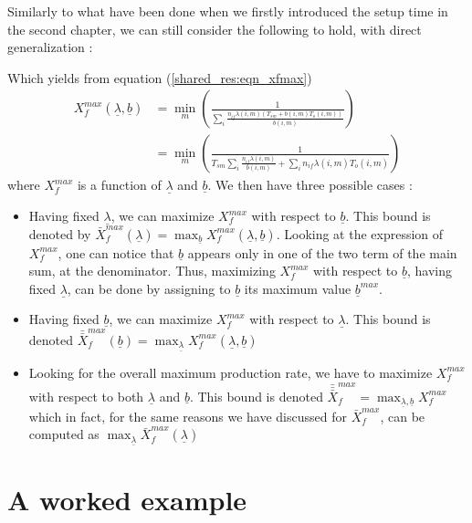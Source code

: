 Similarly to what have been done when we firstly introduced the setup time in the second chapter, we can still consider the following to hold, with direct generalization : 
\begin{center}
\end{center}
Which yields from equation (\ref{shared_res:eqn_xfmax})
\[
    \begin{split}
        X_f^{max}(\underline\lambda, \underline b)
        &= \min_m\left( \frac{1}{ \sum_i\frac{ n_{if}\lambda(i,m)(T_{sm}+b(i,m)T_o(i,m)) }{b(i,m)} } \right)\\
        &= \min_m\left( \frac{1}{T_{sm}\sum_i\frac{n_{if}\lambda(i,m)}{b(i,m)} + \sum_i n_{if}\lambda(i,m)T_o(i,m)} \right)
    \end{split}
\] where $X_f^{max}$ is a function of $\underline\lambda$ and $\underline b$. We then have three possible cases :
\begin{itemize}
    \item Having fixed $\underline\lambda$, we can maximize $X_f^{max}$ with respect to $\underline b$. This bound is denoted by $\bar X_f^{max}(\underline\lambda) = \max_{\underline b}X_f^{max}(\underline\lambda, \underline b)$. Looking at the expression of $X_f^{max}$, one can notice that $\underline b$ appears only in one of the two term of the main sum, at the denominator. Thus, maximizing $X_f^{max}$ with respect to $\underline b$, having fixed $\underline\lambda$, can be done by assigning to $\underline b$ its maximum value $\underline b^{max}$.
    \item Having fixed $\underline b$, we can maximize $X_f^{max}$ with respect to $\underline \lambda$. This bound is denoted $\bar\bar X_f^{max}(\underline b) = \max_{\underline\lambda}X_f^{max}(\underline\lambda, \underline b)$
    \item Looking for the overall maximum production rate, we have to maximize $X_f^{max}$ with respect to both $\underline\lambda$ and $\underline b$. This bound is denoted $\bar\bar\bar X_f^{max} = \max_{\underline\lambda, \underline b}X_f^{max}$ which in fact, for the same reasons we have discussed for $\bar X_f^{max}$, can be computed as $\max_{\underline\lambda}\bar X_f^{max}(\underline\lambda)$
\end{itemize}

\section{A worked example}


